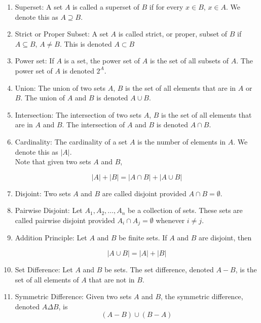 \documentclass{article}
\begin{document}
\begin{enumerate}
		\item Superset: A set $A$ is called a superset of $B$ if for every $x\in B$, $x\in A$.
		We denote this as $A\supseteq B$.
		
		\item Strict or Proper Subset: A set $A$ is called strict, or proper, subset of $B$ if $A \subseteq B$, $A\neq B$.
		This is denoted $A\subset B$
		
		\item Power set: If $A$ is a set, the power set of $A$ is the set of all subsets of $A$.
		The power set of $A$ is denoted $2^A$.
		
		\item Union: The union of two sets $A$, $B$ is the set of all elements that are in $A$ or $B$.
		The union of $A$ and $B$ is denoted $A\cup B$.
		
		\item Intersection: The intersection of two sets $A$, $B$ is the set of all elements that are in $A$ and $B$.
		The intersection of $A$ and $B$ is denoted $A\cap B$.
		
		\item Cardinality: The cardinality of a set $A$ is the number of elements in $A$.
		We denote this as $|A|$.\\
		
		Note that given two sets $A$ and $B$,
		
		\[|A|+|B|=|A\cap B|+|A\cup B|\]
		
		\item Disjoint: Two sets $A$ and $B$ are called disjoint provided $A\cap B=\emptyset$.
		
		\item Pairwise Disjoint: Let $A_1,A_2,\dots,A_n$ be a collection of sets.
		These sets are called pairwise disjoint provided $A_i\cap A_j=\emptyset$ whenever $i\neq j$.
		
		\item Addition Principle: Let $A$ and $B$ be finite sets.
		If $A$ and $B$ are disjoint, then
		
		\[|A\cup B|=|A|+|B|\]
		
		\item Set Difference: Let $A$ and $B$ be sets.
		The set difference, denoted $A-B$, is the set of all elements of $A$ that are not in $B$.
		
		\item Symmetric Difference: Given two sets $A$ and $B$, the symmetric difference, denoted $A\Delta B$, is
		\[(A-B)\cup (B-A)\]
		

\end{enumerate}
\end{document}
